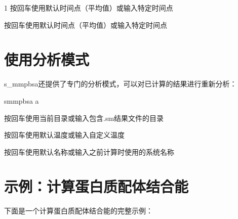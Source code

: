 \documentclass[letterpaper,10pt,english]{sphinxmanual}
\begin{document}
\begin{sphinxVerbatim}[commandchars=\\\{\}]
\PYGZhy{}1
\PYG{o}{[}按回车使用默认时间点（平均值）或输入特定时间点\PYG{o}{]}



\PYG{o}{[}按回车使用默认时间点（平均值）或输入特定时间点\PYG{o}{]}


\end{sphinxVerbatim}


\section{使用分析模式}
\label{\detokenize{quick_start:id7}}
\sphinxAtStartPar
s\_mmpbsa还提供了专门的分析模式，可以对已计算的结果进行重新分析：

\begin{sphinxVerbatim}[commandchars=\\\{\}]
s\PYGZus{}mmpbsa
a

\PYG{o}{[}按回车使用当前目录或输入包含.sm结果文件的目录\PYG{o}{]}

\PYG{o}{[}按回车使用默认温度或输入自定义温度\PYG{o}{]}

\PYG{o}{[}按回车使用默认名称或输入之前计算时使用的系统名称\PYG{o}{]}

\end{sphinxVerbatim}


\section{示例：计算蛋白质\sphinxhyphen{}配体结合能}
\label{\detokenize{quick_start:id8}}
\sphinxAtStartPar
下面是一个计算蛋白质\sphinxhyphen{}配体结合能的完整示例：
\end{document}

